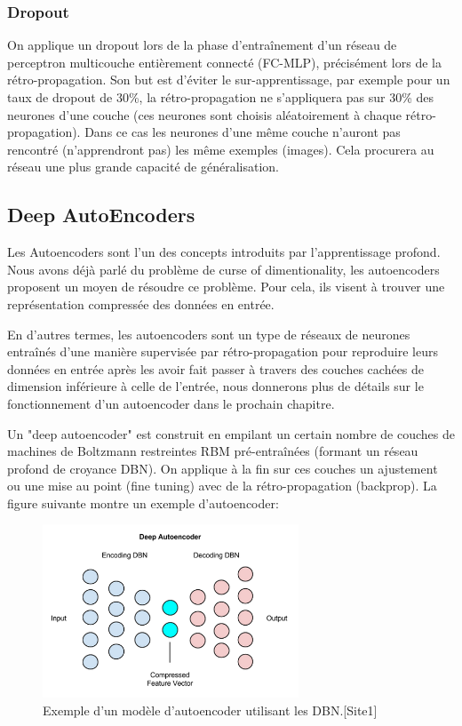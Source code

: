 \subsubsection{Dropout}

	On applique un dropout lors de la phase d'entraînement d'un réseau de perceptron multicouche entièrement connecté (FC-MLP), précisément lors de la rétro-propagation. Son but est d'éviter le sur-apprentissage, par exemple pour un taux de dropout de 30\%, la rétro-propagation ne s'appliquera pas sur 30\% des neurones d'une couche (ces neurones sont choisis aléatoirement à chaque rétro-propagation). Dans ce cas les neurones d'une même couche n'auront pas rencontré (n'apprendront pas) les même exemples (images). Cela procurera au réseau une plus grande capacité de généralisation.

\subsection{Deep AutoEncoders}

	Les Autoencoders sont l'un des concepts introduits par l'apprentissage profond. Nous avons déjà parlé du problème de curse of dimentionality, les autoencoders proposent un moyen de résoudre ce problème. Pour cela, ils visent à trouver une représentation compressée des données en entrée.
	
	En d'autres termes, les autoencoders sont un type de réseaux de neurones entraînés d'une manière supervisée par rétro-propagation pour reproduire leurs données en entrée après les avoir fait passer à travers des couches cachées de dimension inférieure à celle de l'entrée, nous donnerons plus de détails sur le fonctionnement d'un autoencoder dans le prochain chapitre.


	Un "deep autoencoder" est construit en empilant un certain nombre de couches de machines de Boltzmann restreintes RBM pré-entraînées (formant un réseau profond de croyance DBN). On applique à la fin sur ces couches un ajustement ou une mise au point (fine tuning) avec de la rétro-propagation (backprop). La figure suivante montre un exemple d'autoencoder:

\begin{figure}[H]
\centering
	\includegraphics[width=3in]{Figures/deep_autoencoder.png}
\caption[An Electron]{Exemple d'un modèle d'autoencoder utilisant les DBN.[Site1]}
\label{fig:Electron}
\end{figure}

